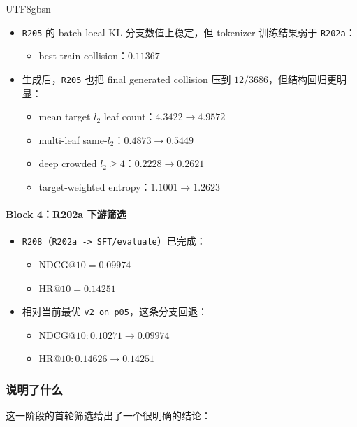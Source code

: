 \documentclass[11pt]{article}
\begin{document}
\begin{CJK*}{UTF8}{gbsn}
\begin{itemize}
  \item \texttt{R205} 的 batch-local KL 分支数值上稳定，但 tokenizer 训练结果弱于 \texttt{R202a}：
  \begin{itemize}
    \item best train collision：\(0.11367\)
  \end{itemize}
  \item 生成后，\texttt{R205} 也把 final generated collision 压到 \(12/3686\)，但结构回归更明显：
  \begin{itemize}
    \item mean target \(l_2\) leaf count：\(4.3422 \rightarrow 4.9572\)
    \item multi-leaf same-\(l_2\)：\(0.4873 \rightarrow 0.5449\)
    \item deep crowded \(l_2 \ge 4\)：\(0.2228 \rightarrow 0.2621\)
    \item target-weighted entropy：\(1.1001 \rightarrow 1.2623\)
  \end{itemize}
\end{itemize}

\paragraph{Block 4：R202a 下游筛选}

\begin{itemize}
  \item \texttt{R208}（\texttt{R202a -> SFT/evaluate}）已完成：
  \begin{itemize}
    \item \(\mathrm{NDCG}@10 = 0.09974\)
    \item \(\mathrm{HR}@10 = 0.14251\)
  \end{itemize}
  \item 相对当前最优 \texttt{v2\_on\_p05}，这条分支回退：
  \begin{itemize}
    \item \(\mathrm{NDCG}@10: 0.10271 \rightarrow 0.09974\)
    \item \(\mathrm{HR}@10: 0.14626 \rightarrow 0.14251\)
  \end{itemize}
\end{itemize}

\subsubsection*{说明了什么}

这一阶段的首轮筛选给出了一个很明确的结论：


\end{CJK*}
\end{document}
